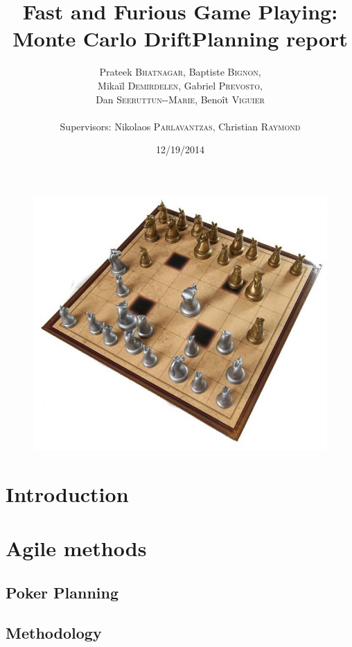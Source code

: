 \documentclass[12pt]{article}
\title{Fast and Furious Game Playing: Monte Carlo Drift\smallbreak Planning report} %
\author{Prateek \textsc{Bhatnagar}, Baptiste \textsc{Bignon}, \\
        Mikaïl \textsc{Demirdelen}, Gabriel \textsc{Prevosto}, \\
        Dan \textsc{Seeruttun-{}-Marie}, Benoît \textsc{Viguier} \\
        \\
        Supervisors: Nikolaos \textsc{Parlavantzas}, Christian \textsc{Raymond}}
\date{12/19/2014}
\begin{document}
\maketitle

\begin{figure}[!h] 
\centerline{\includegraphics[scale=0.50]{Pictures/arimaa}}
\end{figure}
\newpage

\tableofcontents
\newpage


\section{Introduction}					\label{sec:introduction} 		
\newpage

\section{Agile methods}					\label{sec:AgileMethod}
	\subsection{Poker Planning}			\label{sec:PokerPlanning}		
	\subsection{Methodology}			\label{sec:Method}			
\newpage
\end{document}
